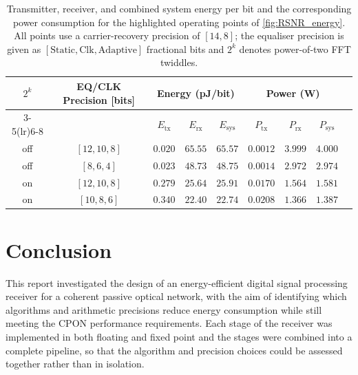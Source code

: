 \documentclass[12pt,a4paper]{report}
\begin{document}
\begin{table}[H]
    \centering
    \caption{Transmitter, receiver, and combined system energy per bit and the corresponding power consumption for the highlighted operating points of \cref{fig:RSNR_energy}. All points use a carrier-recovery precision of $[14,8]$; the equaliser precision is given as $[\text{Static},\text{Clk},\text{Adaptive}]$ fractional bits and $2^k$ denotes power-of-two FFT twiddles.}
    \label{tab:tx_rx_energy}
    \begin{tabular}{ccccccccc}
        \toprule
        \multirow{2}{*}{$2^k$} & \multirow{2}{*}{EQ/CLK Precision [bits]} & \multicolumn{3}{c}{Energy (pJ/bit)} & \multicolumn{3}{c}{Power (W)} \\
        \cmidrule(lr){3-5}\cmidrule(lr){6-8}
         & & $E_\mathrm{tx}$ & $E_\mathrm{rx}$ & $E_\mathrm{sys}$ & $P_\mathrm{tx}$ & $P_\mathrm{rx}$ & $P_\mathrm{sys}$ \\
        \midrule
        off & $[12,10,8]$ & $0.020$ & $65.55$ & $65.57$ & $0.0012$ & $3.999$ & $4.000$ \\
        off & $[8,6,4]$   & $0.023$ & $48.73$ & $48.75$ & $0.0014$ & $2.972$ & $2.974$ \\
        on  & $[12,10,8]$ & $0.279$ & $25.64$ & $25.91$ & $0.0170$ & $1.564$ & $1.581$ \\
        on  & $[10,8,6]$  & $0.340$ & $22.40$ & $22.74$ & $0.0208$ & $1.366$ & $1.387$ \\
        \bottomrule
    \end{tabular}
\end{table}

\chapter{Conclusion}\label{chapter:conclusion}
This report investigated the design of an energy-efficient digital signal processing receiver for a coherent passive optical network, with the aim of identifying which algorithms and arithmetic precisions reduce energy consumption while still meeting the CPON performance requirements. Each stage of the receiver was implemented in both floating and fixed point and the stages were combined into a complete pipeline, so that the algorithm and precision choices could be assessed together rather than in isolation.
\end{document}
